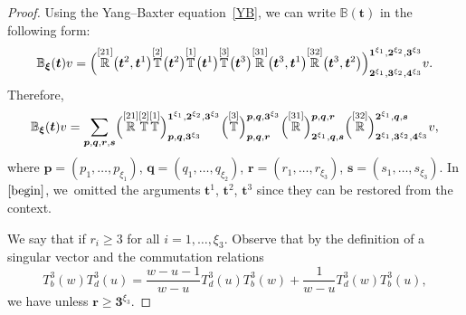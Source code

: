\documentclass[10pt,a4paper]{amsart}
\numberwithin{equation}{section}
\begin{document}
\begin{proof}
Using the Yang--Baxter equation~\eqref{YB}, we can write ${\mathbb{B}}(\boldsymbol{t})$ in the following form:
\begin{equation*}%
{\mathbb{B}}_{\boldsymbol{\xi}}(\boldsymbol{t})v=\Bigl( \overset{[21]}{\mathbb{R}}\bigl(\boldsymbol{t}^2,\boldsymbol{t}^1\bigr)\overset{[2]}{\mathbb{T}}\bigl(\boldsymbol{t}^2\bigr)\overset{[1]}{\mathbb{T}}\bigl(\boldsymbol{t}^1\bigr) \overset{[3]}{\mathbb{T}}\bigl(\boldsymbol{t}^3\bigr)\overset{[31]}{\mathbb{R}}\bigl(\boldsymbol{t}^3,\boldsymbol{t}^1\bigr)\overset{[32]}{\mathbb{R}} \bigl(\boldsymbol{t}^3,\boldsymbol{t}^2\bigr)\Bigr)^{\boldsymbol{1}^{\xi_1}, \boldsymbol{2}^{\xi_2}, \boldsymbol{3}^{\xi_3}}_{\boldsymbol{2}^{\xi_1}, \boldsymbol{3}^{\xi_2}, \boldsymbol{4}^{\xi_3}}v.
\end{equation*}
Therefore,
\begin{equation}\label{begin}
{\mathbb{B}}_{\boldsymbol{\xi}}(\boldsymbol{t})v=\sum_{\boldsymbol{p},\boldsymbol{q},\boldsymbol{r},\boldsymbol{s}}\Bigl( \overset{[21]}{\mathbb{R}} \overset{[2]}{\mathbb{T}} \overset{[1]}{\mathbb{T}} \Big)^{\boldsymbol{1}^{\xi_1},\boldsymbol{2}^{\xi_2}, \boldsymbol{3}^{\xi_3}}_{\boldsymbol{p},\boldsymbol{q},\boldsymbol{3}^{\xi_3}} \Bigl( \overset{[3]}{\mathbb{T}} \Big)^{\boldsymbol{p},\boldsymbol{q},\boldsymbol{3}^{\xi_3}}_{\boldsymbol{p},\boldsymbol{q},\boldsymbol{r}} \Bigl(\overset{[31]}{\mathbb{R}} \Big)^{\boldsymbol{p},\boldsymbol{q},\boldsymbol{r}}_{\boldsymbol{2}^{\xi_1},\boldsymbol{q},\boldsymbol{s}} \Bigl( \overset{[32]}{\mathbb{R}} \Big)^{\boldsymbol{2}^{\xi_1},\boldsymbol{q},\boldsymbol{s}}_{\boldsymbol{2}^{\xi_1},\boldsymbol{3}^{\xi_2},\boldsymbol{4}^{\xi_3}}v,
\end{equation}
where $\boldsymbol{p}=(p_1,\dots, p_{\xi_1})$, $\boldsymbol{q}=(q_1,\dots, q_{\xi_2})$, $\boldsymbol{r}=(r_1,\dots, r_{\xi_3})$, $\boldsymbol{s}=(s_1,\dots, s_{\xi_3})$. In $\eqref{begin}$, we~omitted the arguments $\boldsymbol{t}^{1}$, $\boldsymbol{t}^{2}$, $\boldsymbol{t}^{3}$ since they can be restored from the context.

We say that  if $r_i\geq 3$ for all $i=1,\dots, \xi_3$. Observe that by the definition of a singular vector and the commutation relations
\begin{equation*}
T^{3}_b(w)T^3_d(u)=\frac{w-u-1}{w-u} T^3_d(u)T^3_b(w)+\frac{1}{w-u}T^3_d(w)T^3_b(u),
\end{equation*}
we have  unless $\boldsymbol{r}\geq \boldsymbol{3}^{\xi_3}$.


\end{proof}
\end{document}

